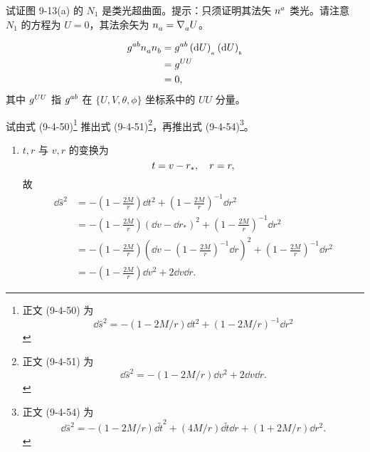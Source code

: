 \begin{xiti}
	\item 试证图 9-13(a) 的 $N_1$ 是类光超曲面。提示：只须证明其法矢 $\tensor{n}{^a}$ 类光。请注意 $N_1$ 的方程为 $U=0$，其法余矢为 $\tensor{n}{_a} = \Nabla{a} U$。
	\begin{zm}
		\begin{align*}
			\tensor{g}{^a^b} \tensor{n}{_a} \tensor{n}{_b} &= \tensor{g}{^a^b} \tensord{U}{_a} \tensord{U}{_b}\\
			&= \tensor{g}{^U^U}\\
			&= 0,
		\end{align*}
		其中 $\tensor{g}{^U^U}$ 指 $\tensor{g}{^a^b}$ 在 $\{ U, V, \theta, \phi \}$ 坐标系中的 $UU$ 分量。
	\end{zm}

	\item 试由式 (9-4-50)\footnote{
		正文 (9-4-50) 为
		\begin{equation}
			\dd \hat{s}^2 = - \left( 1 - 2M/r \right) \dd t^2 + \left( 1 - 2M/r \right)^{-1} \dd r^2 \tag{9-4-50}
		\end{equation}
	} 推出式 (9-4-51)\footnote{
		正文 (9-4-51) 为
		\begin{equation}
			\dd \hat{s}^2 = - \left( 1 - 2M/r \right) \dd v^2 + 2 \dd v \dd r. \tag{9-4-51}
		\end{equation}
	}，再推出式 (9-4-54)\footnote{
		正文 (9-4-54) 为
		\begin{equation}
			\dd \hat{s}^2 = - \left( 1 - 2M/r \right) \dd{\tilde{t}}^2 + \left( 4M/r \right) \dd{\tilde{t}} \dd{r} + \left( 1 + 2M/r \right) \dd{r}^2. \tag{9-4-54}
		\end{equation}
	}。
	\begin{zm}
		\begin{enumerate}
			\item $t,r$ 与 $v,r$ 的变换为
				\begin{equation*}
					t = v-r_* \qc r = r,
				\end{equation*}
				故
				\begin{align*}
					\dd \hat{s}^2 &= - \left( 1 - \frac{2M}{r} \right) \dd t^2 + \left( 1 - \frac{2M}{r} \right)^{-1} \dd{r}^2\\
					&= - \left( 1 - \frac{2M}{r} \right) \left( \dd{v} - \dd{r_*} \right)^2 + \left( 1 - \frac{2M}{r} \right)^{-1} \dd{r}^2\\
					&= - \left( 1 - \frac{2M}{r} \right) \left( \dd{v} - \left( 1 - \frac{2M}{r} \right)^{-1} \dd{r} \right)^2 + \left( 1 - \frac{2M}{r} \right)^{-1} \dd{r}^2\\
					&= - \left( 1 - \frac{2M}{r} \right) \dd{v}^2 + 2 \dd{v} \dd{r}.

\end{align*}
\end{enumerate}
\end{zm}
\end{xiti}
